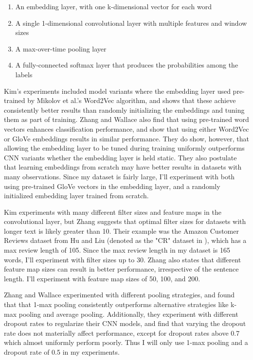 \documentclass[11pt,a4paper]{article}
\begin{document}
	\begin{enumerate}
		\item An embedding layer, with one k-dimensional vector for each word
		\item A single 1-dimensional convolutional layer with multiple features and window sizes
		\item A max-over-time pooling layer
		\item A fully-connected softmax layer that produces the probabilities among the labels
	\end{enumerate}

	Kim's experiments included model variants where the embedding layer used pre-trained by Mikolov et al.'s \cite{word2vec} Word2Vec algorithm, and shows that these achieve consistently better results than randomly initializing the embeddings and tuning them as part of training. Zhang and Wallace \cite{Zhang} also find that using pre-trained word vectors enhances classification performance, and show that using either Word2Vec or GloVe \cite{Pennington} embeddings results in similar performance. They do show, however, that allowing the embedding layer to be tuned during training uniformly outperforms CNN variants whether the embedding layer is held static. They also postulate that learning embeddings from scratch may have better results in datasets with many observations. Since my dataset is fairly large, I'll experiment with both using pre-trained GloVe vectors in the embedding layer, and a randomly initialized embedding layer trained from scratch.
	
	Kim \cite{Kim} experiments with many different filter sizes and feature maps in the convolutional layer, but Zhang \cite{Zhang} suggests that optimal filter sizes for datasets with longer text is likely greater than 10. Their example was the Amazon Customer Reviews dataset from Hu and Liu \cite{Hu} (denoted as the "CR" dataset in \cite{Zhang}), which has a max review length of 105. Since the max review length in my dataset is 165 words, I'll experiment with filter sizes up to 30. Zhang \cite{Zhang} also states that different feature map sizes can result in better performance, irrespective of the sentence length. I'll experiment with feature map sizes of 50, 100, and 200.
	
	Zhang and Wallace \cite{Zhang} experimented with different pooling strategies, and found that that 1-max pooling consistently outperforms alternative strategies like k-max pooling and average pooling. Additionally, they experiment with different dropout rates to regularize their CNN models, and find that varying the dropout rate does not materially affect performance, except for dropout rates above 0.7 which almost uniformly perform poorly. Thus I will only use 1-max pooling and a dropout rate of 0.5 in my experiments.
\end{document}

